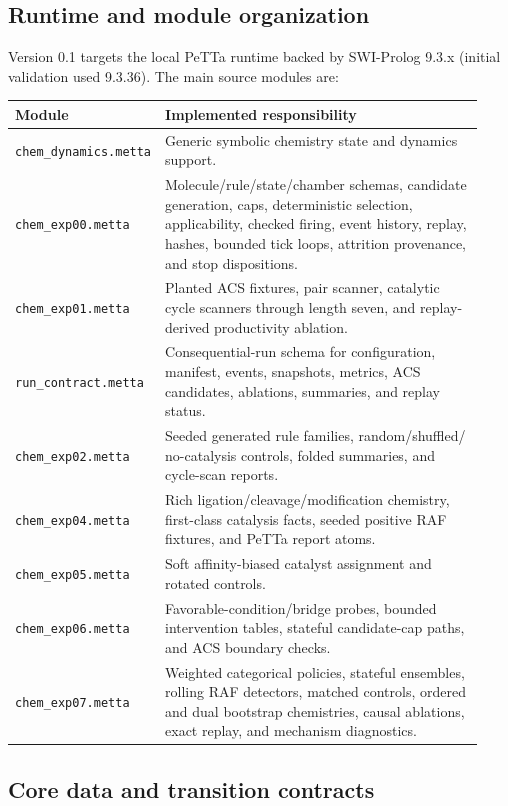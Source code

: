 \documentclass[11pt]{article}
\newcommand{\code}[1]{\texttt{#1}}
\begin{document}
\subsection{Runtime and module organization}

Version 0.1 targets the local PeTTa runtime backed by SWI-Prolog 9.3.x
(initial validation used 9.3.36).  The main source modules are:

\begin{longtable}{p{0.25\linewidth}p{0.68\linewidth}}
\toprule
Module & Implemented responsibility \\
\midrule
\endhead
\code{chem\_dynamics.metta} & Generic symbolic chemistry state and dynamics
support. \\
\code{chem\_exp00.metta} & Molecule/rule/state/chamber schemas, candidate
generation, caps, deterministic selection, applicability, checked firing,
event history, replay, hashes, bounded tick loops, attrition provenance, and
stop dispositions. \\
\code{chem\_exp01.metta} & Planted ACS fixtures, pair scanner, catalytic cycle
scanners through length seven, and replay-derived productivity ablation. \\
\code{run\_contract.metta} & Consequential-run schema for configuration,
manifest, events, snapshots, metrics, ACS candidates, ablations, summaries,
and replay status. \\
\code{chem\_exp02.metta} & Seeded generated rule families, random/shuffled/
no-catalysis controls, folded summaries, and cycle-scan reports. \\
\code{chem\_exp04.metta} & Rich ligation/cleavage/modification chemistry,
first-class catalysis facts, seeded positive RAF fixtures, and PeTTa report
atoms. \\
\code{chem\_exp05.metta} & Soft affinity-biased catalyst assignment and rotated
controls. \\
\code{chem\_exp06.metta} & Favorable-condition/bridge probes, bounded
intervention tables, stateful candidate-cap paths, and ACS boundary checks. \\
\code{chem\_exp07.metta} & Weighted categorical policies, stateful ensembles,
rolling RAF detectors, matched controls, ordered and dual bootstrap
chemistries, causal ablations, exact replay, and mechanism diagnostics. \\
\bottomrule
\end{longtable}

\subsection{Core data and transition contracts}
\end{document}
